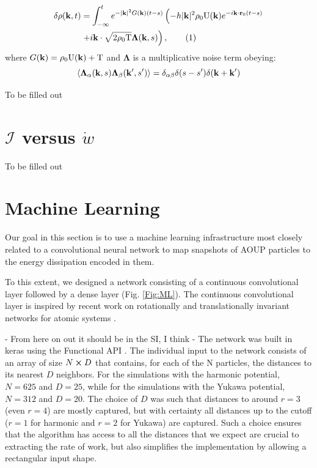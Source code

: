 \documentclass[amsmath,preprintnumbers,10pt,nofootinbib,prl,twocolumn]{revtex4-1}
\newcommand{\T}{\text{T}}
\newcommand{\U}{\text{U}}
\newcommand\numberthis{\addtocounter{equation}{1}\tag{\theequation}}
\begin{document}
\begin{align*}\label{eq:red_field_EOM_k}
\delta \rho( {\bf k}, t) & = \int_{-\infty}^t e^{-|{\bf k}|^2 G({\bf k}) (t-s)} \left( -h |{\bf k}|^2 \rho_0 \U({\bf k}) e^{-i{\bf k} \cdot {\bf r}_0(t - s)} \right. \\
& \left. + i{\bf k} \cdot \sqrt{2\rho_0 \T} \bm{\Lambda} ({\bf k}, s) \right),\numberthis
\end{align*}
where $G({\bf k}) = \rho_0 \U({\bf k}) + \T$ and $\bm{\Lambda}$ is a multiplicative noise term obeying:
\begin{equation}\label{eq:field_noise_k}
\langle {\bm \Lambda}_{\alpha}({\bf k}, s)  {\bm \Lambda}_{\beta}({\bf k}', s')  \rangle = \delta_{\alpha \beta}\delta(s-s')\delta({\bf k} + {\bf k}')
\end{equation}


To be filled out

\section{$\mathcal{I}$ versus $\dot{w}$}

To be filled out

\section{Machine Learning}

Our goal in this section is to use a machine learning infrastructure most closely related to a convolutional neural network to map snapshots of AOUP particles to the energy dissipation encoded in them. 

To this extent, we designed a network consisting of a continuous convolutional layer followed by a dense layer (Fig. \ref{Fig:ML}). The continuous convolutional layer is inspired by recent work on rotationally and translationally invariant networks for atomic systems \cite{tess2018}. 

- From here on out it should be in the SI, I think -
The network was built in keras using the Functional API \cite{keras}. The individual input to the network consists of an array of size $N \cross D$ that contains, for each of the N particles, the distances to its nearest $D$ neighbors. For the simulations with the harmonic potential, $N = 625$ and $D = 25$, while for the simulations with the Yukawa potential, $N = 312$ and $D = 20$. The choice of $D$ was such that distances to around $r = 3$ (even $r = 4$) are mostly captured, but with certainty all distances up to the cutoff ($r = 1$ for harmonic and $r=2$ for Yukawa) are captured. Such a choice ensures that the algorithm has access to all the distances that we expect are crucial to extracting the rate of work, but also simplifies the implementation by allowing a rectangular input shape.
\end{document}
